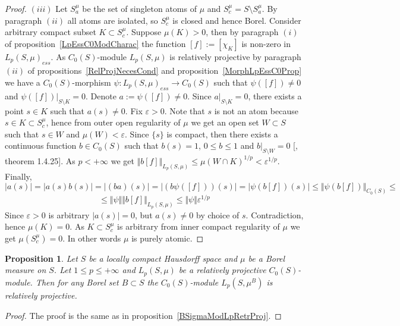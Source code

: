 \documentclass[12pt]{article}
\newtheorem{proposition}[theorem]{Proposition}
\begin{document}
\begin{proof}
    $(iii)$ Let $S_a^\mu$ be the set of singleton atoms of $\mu$ and
    $S_c^\mu=S\setminus S_a^\mu$. By paragraph $(ii)$ all atoms are isolated, so
    $S_c^\mu$ is closed and hence Borel. Consider arbitrary compact subset
    $K\subset S_c^\mu$. Suppose $\mu(K)>0$, then by paragraph $(i)$ of
    proposition~\ref{LpEssC0ModCharac} the function $[f]:=[\chi_K]$ is non-zero
    in ${L_p(S,\mu)}_{ess}$. As $C_0(S)$-module $L_p(S, \mu)$ is relatively
    projective by paragraph $(ii)$ of propositions~\ref{RelProjNecesCond} and
    proposition~\ref{MorphLpEssC0Prop} we have a $C_0(S)$-morphism
    $\psi:{L_p(S,\mu)}_{ess}\to C_0(S)$ such that $\psi([f])\neq 0$ and
    $\psi([f])|_{S\setminus K}=0$. Denote $a:=\psi([f])\neq 0$. Since
    $a|_{S\setminus K}=0$, there exists a point $s\in K$ such that $a(s)\neq 0$.
    Fix $\varepsilon > 0$. Note that $s$ is not an atom because $s\in K\subset
        S_c^\mu$, hence from outer open regularity of $\mu$ we get an open set
    $W\subset S$ such that $s\in W$ and $\mu(W)<\varepsilon$. Since $\{s\}$ is
    compact, then there exists a continuous function $b\in C_0(S)$ such that
    $b(s)=1$, $0\leq b\leq 1$ and $b|_{S\setminus W}=0$
    [\cite{DalesBanSpContFunDualSp}, theorem 1.4.25]. As $p<+\infty$ we get
    $\Vert b[f]\Vert_{L_p(S,\mu)} \leq {\mu(W\cap K)}^{1/p}<\varepsilon^{1/p}$.
    Finally,
    $$
        |a(s)|=|a(s)b(s)|=|(ba)(s)|=|(b\psi([f]))(s)|=|\psi(b[f])(s)|
        \leq\Vert \psi (b[f])\Vert_{C_0(S)}\leq
    $$
    $$
        \leq\Vert\psi\Vert\Vert b[f]\Vert_{L_p(S,\mu)}
        \leq\Vert\psi\Vert\varepsilon^{1/p}
    $$
    Since $\varepsilon>0$ is arbitrary $|a(s)|=0$, but $a(s)\neq 0$ by choice of
    $s$. Contradiction, hence $\mu(K)=0$. As $K\subset S_c^\mu$ is arbitrary
    from inner compact regularity of $\mu$ we get $\mu(S_c^\mu)=0$. In other
    words $\mu$ is purely atomic.
\end{proof}

\begin{proposition}\label{C0ModLpRetrProj} Let $S$ be a locally compact
    Hausdorff space and $\mu$ be a Borel measure on $S$. Let $1\leq p\leq
        +\infty$ and $L_p(S,\mu)$ be a relatively projective $C_0(S)$-module. Then
    for any Borel set $B\subset S$ the $C_0(S)$-module $L_p(S,\mu^B)$ is
    relatively projective.
\end{proposition}
\begin{proof} The proof is the same as in proposition~\ref{BSigmaModLpRetrProj}.
\end{proof}
\end{document}
